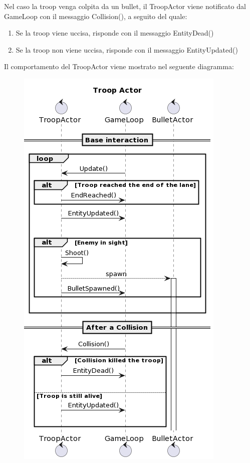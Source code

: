 Nel caso la troop venga colpita da un bullet, il TroopActor viene notificato dal GameLoop con il messaggio Collision(), a seguito del quale:

\begin{enumerate}
    \item Se la troop viene uccisa, risponde con il messaggio EntityDead()
    \item Se la troop non viene uccisa, risponde con il messaggio EntityUpdated()
\end{enumerate}

Il comportamento del TroopActor viene mostrato nel seguente diagramma:

\begin{figure}[H]
    \centering
    \includegraphics[width=\linewidth]{images/troop-actor.png}
    \label{Diagramma di sequenza del Troop Actor.}
\end{figure}

